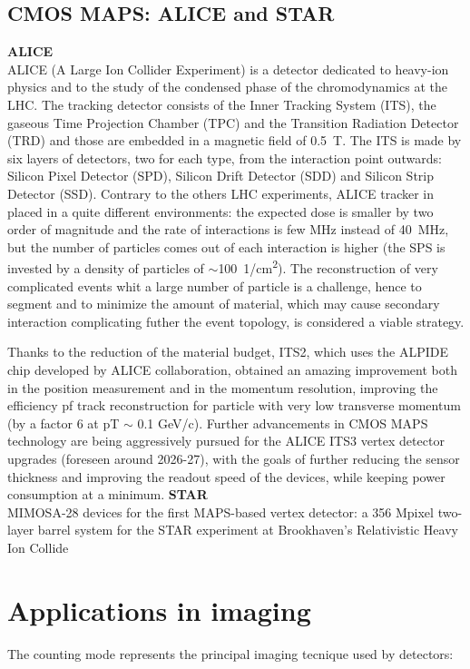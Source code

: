     \subsection{CMOS MAPS: ALICE and STAR}
        \textbf{ALICE}\\
        ALICE (A Large Ion Collider Experiment) is a detector dedicated to heavy-ion physics and to the study of the condensed phase of the chromodynamics at the LHC.
        The tracking detector consists of the Inner Tracking System (ITS), the gaseous Time Projection Chamber (TPC) and the Transition Radiation Detector (TRD) and those are embedded in a magnetic field of \SI{0.5}{T}. The ITS is made by six layers of detectors, two for each type, from the interaction point outwards: Silicon Pixel Detector (SPD), Silicon Drift Detector (SDD) and Silicon Strip Detector (SSD).         
        Contrary to the others LHC experiments, ALICE tracker in placed in a quite different environments: the expected dose is smaller by two order of magnitude and the rate of interactions is few \si{MHz} instead of \SI{40}{MHz}, but the number of particles comes out of each interaction is higher (the SPS is invested by a density of particles of $\sim$\SI{100}{1/cm\squared}).  
        The reconstruction of very complicated events whit a large number of particle is a challenge, hence to segment and to minimize the amount of material, which may cause secondary interaction complicating futher the event topology, is considered a viable strategy. 

        Thanks to the reduction of the material budget, ITS2, which uses the ALPIDE chip developed by ALICE collaboration, obtained an amazing improvement both in the position measurement and in the momentum resolution, improving the efficiency pf track reconstruction for particle with very low transverse momentum (by a factor 6 at pT $\sim$ 0.1 GeV/c). Further advancements in CMOS MAPS technology are being aggressively pursued for the ALICE ITS3 vertex detector upgrades (foreseen around 2026-27), with the goals of further reducing the sensor thickness and improving the readout speed of the devices, while keeping power consumption at a minimum.
        \vspace{5mm}
        \textbf{STAR}\\
        MIMOSA-28 devices for the first MAPS-based vertex detector: a 356 Mpixel two-layer barrel system for the STAR experiment at Brookhaven’s Relativistic Heavy Ion Collide

\section{Applications in imaging}
    The counting mode represents the principal imaging tecnique used by detectors: 

